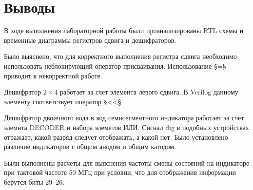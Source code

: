 \section*{Выводы}



В ходе выполнения лабораторной работы были проанализированы RTL схемы и временные диаграммы регистров сдвига и дешифраторов.

Было выяснено, что для корректного выполнения регистра сдвига необходимо использовать неблокирующий оператор присваивания. Использование \texttt§=§ приводит к некорректной работе.

Дешифратор $2\times4$ работает за счет элемента левого сдвига. В Verilog данному элементу соответствует оператор \texttt§<<§.

Дешифратор двоичного кода в код семисегментного индикатора работает за счет элемнта DECODER и набора элеметов ИЛИ. Сигнал dig в подобных устройствах отражает, какой разряд следует отображать, а какой нет. Было установлено различие индикаторов с общим анодом и общим катодом.

Были выполнены расчеты для выяснения частоты смены состояний на индикаторе при тактовой частоте 50 МГц при условии, что для отображения информации берутся биты 29--26.
